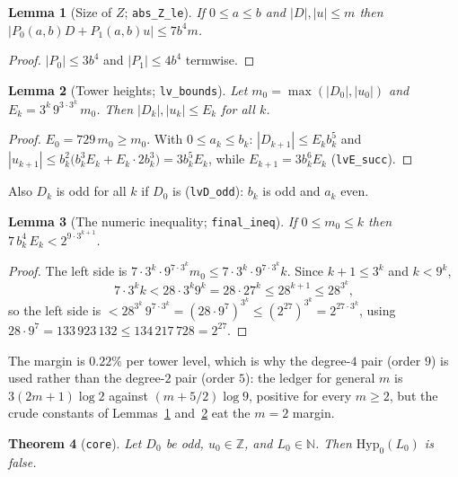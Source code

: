 \documentclass[11pt]{article}
\newtheorem{theorem}{Theorem}[section]
\newtheorem{lemma}[theorem]{Lemma}
\theoremstyle{definition}
\newcommand{\N}{\mathbb{N}}
\newcommand{\Z}{\mathbb{Z}}
\newcommand{\code}[1]{\texttt{#1}}
\begin{document}
\begin{lemma}[Size of $Z$; \code{abs\_Z\_le}]\label{lem:absZ}
If $0 \le a \le b$ and $|D|, |u| \le m$ then $|P_0(a,b) D + P_1(a,b) u|
\le 7 b^4 m$.
\end{lemma}

\begin{proof}
$|P_0| \le 3b^4$ and $|P_1| \le 4 b^4$ termwise.
\end{proof}

\begin{lemma}[Tower heights; \code{lv\_bounds}]\label{lem:heights}
Let $m_0 = \max(|D_0|, |u_0|)$ and $E_k = 3^k\, 9^{3 \cdot 3^k}\, m_0$.
Then $|D_k|, |u_k| \le E_k$ for all $k$.
\end{lemma}

\begin{proof}
$E_0 = 729\, m_0 \ge m_0$. With $0 \le a_k \le b_k$: $|D_{k+1}| \le
E_k b_k^5$ and $|u_{k+1}| \le b_k^2\big(b_k^3 E_k + E_k \cdot 2 b_k^3\big)
= 3 b_k^5 E_k$, while $E_{k+1} = 3 b_k^6 E_k$ (\code{lvE\_succ}).
\end{proof}

Also $D_k$ is odd for all $k$ if $D_0$ is (\code{lvD\_odd}): $b_k$ is
odd and $a_k$ even.

\begin{lemma}[The numeric inequality; \code{final\_ineq}]\label{lem:num}
If $0 \le m_0 \le k$ then $7\, b_k^4\, E_k < 2^{9 \cdot 3^{k+1}}$.
\end{lemma}

\begin{proof}
The left side is $7 \cdot 3^k \cdot 9^{7 \cdot 3^k} m_0 \le 7 \cdot 3^k
\cdot 9^{7\cdot 3^k} k$. Since $k + 1 \le 3^k$ and $k < 9^k$,
\[
7 \cdot 3^k k < 28 \cdot 3^k 9^k = 28 \cdot 27^k \le 28^{k+1} \le 28^{3^k},
\]
so the left side is $< 28^{3^k}\, 9^{7 \cdot 3^k} = (28 \cdot 9^7)^{3^k}
\le (2^{27})^{3^k} = 2^{27 \cdot 3^k}$, using $28 \cdot 9^7 = 133\,923\,132
\le 134\,217\,728 = 2^{27}$.
\end{proof}

The margin is $0.22\%$ per tower level, which is why the degree-$4$
pair (order $9$) is used rather than the degree-$2$ pair (order $5$):
the ledger for general $m$ is $3(2m+1)\log 2$ against $(m + 5/2)\log
9$, positive for every $m \ge 2$, but the crude constants of
Lemmas~\ref{lem:absZ} and~\ref{lem:heights} eat the $m = 2$ margin.

\begin{theorem}[\code{core}]\label{thm:core}
Let $D_0$ be odd, $u_0 \in \Z$, and $L_0 \in \N$. Then
$\mathrm{Hyp}_0(L_0)$ is false.
\end{theorem}
\end{document}
